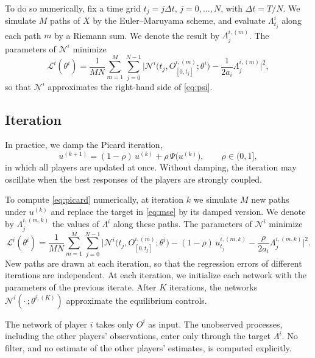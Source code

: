 \documentclass[11pt]{article}
\begin{document}
To do so numerically, fix a time grid $t_j = j \Delta t$, $j = 0, \dots, N$, with $\Delta t = T/N$. We simulate $M$ paths of $X$ by the Euler--Maruyama scheme, and evaluate $\Lambda^i_{t_j}$ along each path $m$ by a Riemann sum. We denote the result by $\Lambda^{i,(m)}_j$. The parameters of $\mathcal{N}^i$ minimize
\begin{equation}
  \label{eq:mse}
  \mathcal{L}^i(\theta^i) = \frac{1}{M N} \sum_{m=1}^{M} \sum_{j=0}^{N-1} \Big| \mathcal{N}^i\big(t_j, O^{i,(m)}_{[0, t_j]}; \theta^i\big) - \frac{1}{2 a_i} \Lambda^{i,(m)}_j \Big|^2 ,
\end{equation}
so that $\mathcal{N}^i$ approximates the right-hand side of \eqref{eq:psi}.

\subsection{Iteration}
\label{sec:iteration}

In practice, we damp the Picard iteration,
\begin{equation}
  \label{eq:picard}
  u^{(k+1)} = (1 - \rho) \, u^{(k)} + \rho \, \Psi\big( u^{(k)} \big) , \qquad \rho \in (0, 1] ,
\end{equation}
in which all players are updated at once. Without damping, the iteration may oscillate when the best responses of the players are strongly coupled.

To compute \eqref{eq:picard} numerically, at iteration $k$ we simulate $M$ new paths under $u^{(k)}$ and replace the target in \eqref{eq:mse} by its damped version. We denote by $\Lambda^{i,(m,k)}_j$ the values of $\Lambda^i$ along these paths. The parameters of $\mathcal{N}^i$ minimize
\begin{equation}
  \label{eq:loss}
  \mathcal{L}^i(\theta^i) = \frac{1}{M N} \sum_{m=1}^{M} \sum_{j=0}^{N-1} \Big| \mathcal{N}^i\big(t_j, O^{i,(m)}_{[0, t_j]}; \theta^i\big) - (1 - \rho) \, u^{i,(m,k)}_{t_j} - \frac{\rho}{2 a_i} \Lambda^{i,(m,k)}_j \Big|^2 .
\end{equation}
New paths are drawn at each iteration, so that the regression errors of different iterations are independent. At each iteration, we initialize each network with the parameters of the previous iterate. After $K$ iterations, the networks $\mathcal{N}^i(\cdot\,; \theta^{i,(K)})$ approximate the equilibrium controls.

The network of player $i$ takes only $O^i$ as input. The unobserved processes, including the other players' observations, enter only through the target $\Lambda^i$. No filter, and no estimate of the other players' estimates, is computed explicitly.
\end{document}
